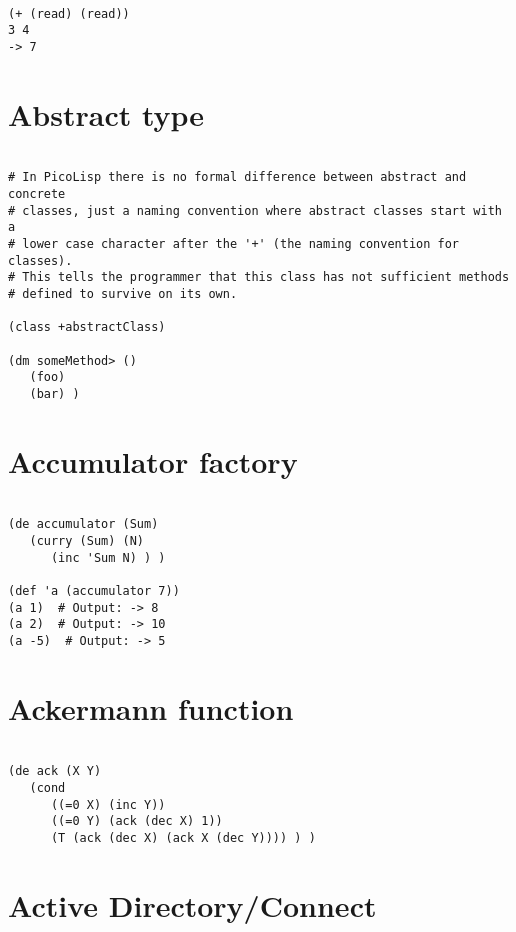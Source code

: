 \begin{verbatim}

(+ (read) (read))
3 4
-> 7

\end{verbatim}

\section*{Abstract type}

\begin{verbatim}

# In PicoLisp there is no formal difference between abstract and concrete
# classes, just a naming convention where abstract classes start with a
# lower case character after the '+' (the naming convention for classes).
# This tells the programmer that this class has not sufficient methods
# defined to survive on its own.

(class +abstractClass)

(dm someMethod> ()
   (foo)
   (bar) )

\end{verbatim}

\section*{Accumulator factory}

\begin{verbatim}

(de accumulator (Sum)
   (curry (Sum) (N)
      (inc 'Sum N) ) )

(def 'a (accumulator 7))
(a 1)  # Output: -> 8
(a 2)  # Output: -> 10
(a -5)  # Output: -> 5

\end{verbatim}

\section*{Ackermann function}

\begin{verbatim}

(de ack (X Y)
   (cond
      ((=0 X) (inc Y))
      ((=0 Y) (ack (dec X) 1))
      (T (ack (dec X) (ack X (dec Y)))) ) )

\end{verbatim}

\section*{Active Directory/Connect}

